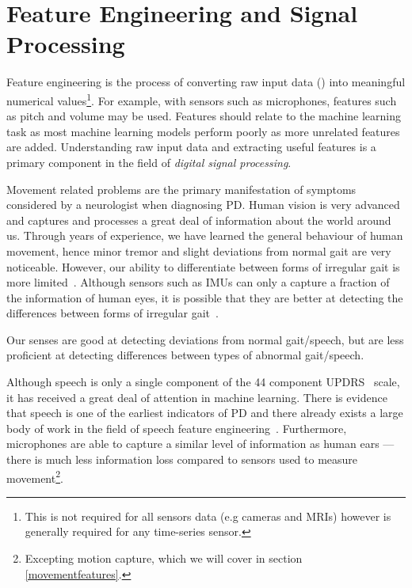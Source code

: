 \documentclass[12pt, twoside]{book}
\renewcommand\emph[1]{\textit{\color{USred}{#1}}}
\begin{document}
\section{Feature Engineering and Signal Processing}
Feature engineering is the process of converting raw input data (\emph{signals}) into meaningful numerical values\footnote{This is not required for all sensors data (e.g cameras and MRIs) however is generally required for any time-series sensor.}. For example, with sensors such as microphones, features such as pitch and volume may be used. Features should relate to the machine learning task as most machine learning models perform poorly as more unrelated features are added. Understanding raw input data and extracting useful features is a primary component in the field of \textit{digital signal processing}. 

Movement related problems are the primary manifestation of symptoms considered by a neurologist when diagnosing PD. Human vision is very advanced and captures and processes a great deal of information about the world around us. Through years of experience, we have learned the general behaviour of human movement, hence minor tremor and slight deviations from normal gait are very noticeable. However, our ability to differentiate between forms of irregular gait is more limited~\cite{parkinsonismdifferential1}. Although sensors such as IMUs can only a capture a fraction of the information of human eyes, it is possible that they are better at detecting the differences between forms of irregular gait~\cite{parkinsonismdifferential2}.

\begin{highlight}
Our senses are good at detecting deviations from normal gait/speech, but are less proficient at detecting differences between types of abnormal gait/speech. 
\end{highlight}

Although speech is only a single component of the 44 component UPDRS~\cite{updrs} scale, it has received a great deal of attention in machine learning. There is evidence that speech is one of the earliest indicators of PD \cite{earlyvowel} and there already exists a large body of work in the field of speech feature engineering~\cite{ostextbook}. Furthermore, microphones are able to capture a similar level of information as human ears --- there is much less information loss compared to sensors used to measure movement\footnote{Excepting motion capture, which we will cover in section \ref{movementfeatures}.}. 
\end{document}
